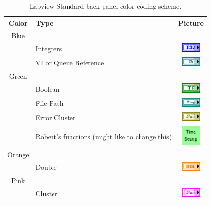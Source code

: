 \begin{table}[h]
\centering
\caption{Labview Standard back panel color coding scheme.}
\begin{tabular}{clc}
\hline\hline
Color	& Type								& Picture															\\
\hline
Blue		& 									& 																\\\hline
		& Integrers							& \includegraphics[height=0.2in]{Figures/ColorCoding_Int.pdf}					\\\hline
		& VI or Queue Reference					& \includegraphics[height=0.2in]{Figures/ColorCoding_VIReference.pdf}			\\\hline
Green	&									&																\\\hline
		& Boolean								& \includegraphics[height=0.2in]{Figures/ColorCoding_Bool.pdf}				\\\hline
		& File Path							& \includegraphics[height=0.2in]{Figures/ColorCoding_FilePath.pdf}				\\\hline
		& Error Cluster							& \includegraphics[height=0.2in]{Figures/ColorCoding_Error.pdf}				\\\hline
		& Robert's functions	(might like to change this) 	& \includegraphics[height=0.4in]{Figures/ColorCoding_Custom.pdf}				\\\hline
Orange	& 									& 																\\\hline
		& Double								& \includegraphics[height=0.2in]{Figures/ColorCoding_Float.pdf}				\\\hline
Pink		&									&																\\\hline
		& Cluster								& \includegraphics[height=0.2in]{Figures/ColorCoding_Cluster.pdf}				\\\hline

\end{tabular}
\end{table}
